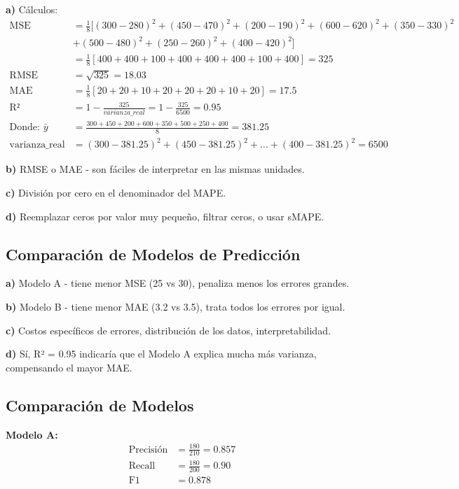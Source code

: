 \documentclass[12pt]{article}
\begin{document}
\textbf{a)} Cálculos:
\begin{align*}
\text{MSE} &= \frac{1}{8}[(300-280)^2 + (450-470)^2 + (200-190)^2 + (600-620)^2 + (350-330)^2\\ &+ (500-480)^2 + (250-260)^2 + (400-420)^2] \\
&= \frac{1}{8}[400 + 400 + 100 + 400 + 400 + 400 + 100 + 400] = 325 \\
\text{RMSE} &= \sqrt{325} = 18.03 \\
\text{MAE} &= \frac{1}{8}[20 + 20 + 10 + 20 + 20 + 20 + 10 + 20] = 17.5 \\
\text{R²} &= 1 - \frac{325}{varianza\_real} = 1 - \frac{325}{6500} = 0.95 \\
\text{Donde: } \bar{y} &= \frac{300+450+200+600+350+500+250+400}{8} = 381.25 \\
\text{varianza\_real} &= (300-381.25)^2 + (450-381.25)^2 + ... + (400-381.25)^2 = 6500
\end{align*}

\textbf{b)} RMSE o MAE - son fáciles de interpretar en las mismas unidades.

\textbf{c)} División por cero en el denominador del MAPE.

\textbf{d)} Reemplazar ceros por valor muy pequeño, filtrar ceros, o usar sMAPE.

\subsection{Comparación de Modelos de Predicción}

\textbf{a)} Modelo A - tiene menor MSE (25 vs 30), penaliza menos los errores grandes.

\textbf{b)} Modelo B - tiene menor MAE (3.2 vs 3.5), trata todos los errores por igual.

\textbf{c)} Costos específicos de errores, distribución de los datos, interpretabilidad.

\textbf{d)} Sí, R² = 0.95 indicaría que el Modelo A explica mucha más varianza, compensando el mayor MAE.

\subsection{Comparación de Modelos}

\textbf{Modelo A:}
\begin{align*}
\text{Precisión} &= \frac{180}{210} = 0.857 \\
\text{Recall} &= \frac{180}{200} = 0.90 \\
\text{F1} &= 0.878
\end{align*}
\end{document}
